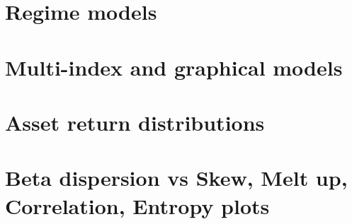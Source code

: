 \documentclass[leqno,12pt]{article}
\begin{document}
{\section{Regime models}

\section{Multi-index and graphical models}

\section{Asset return distributions}

\newpage

\appendix

\section{Beta dispersion vs Skew, Melt up, Correlation, Entropy
plots}

}
\end{document}
